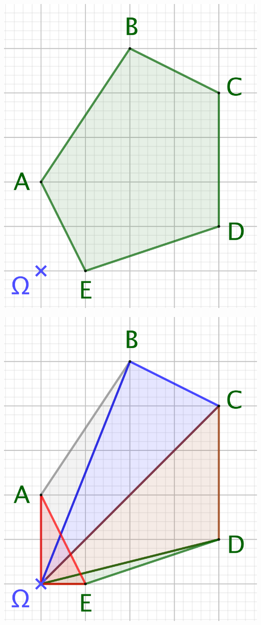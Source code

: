 \begin{multicols}{2}
	\begin{center}
		\includegraphics[scale=.4]{content/polygon/sufficient-cond/g-area-convex-1.png}

		\includegraphics[scale=.4]{content/polygon/sufficient-cond/g-area-convex-2.png}
	\end{center}
\end{multicols}



